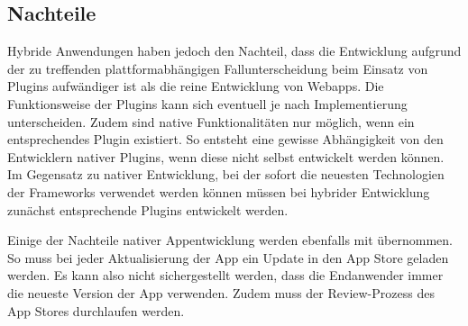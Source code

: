 \subsection{Nachteile}
%
Hybride Anwendungen haben jedoch den Nachteil, dass die Entwicklung aufgrund der zu treffenden plattformabhängigen Fallunterscheidung beim Einsatz von Plugins aufwändiger ist als die reine Entwicklung von Webapps. Die Funktionsweise der Plugins kann sich eventuell je nach Implementierung unterscheiden. Zudem sind native Funktionalitäten nur möglich, wenn ein entsprechendes Plugin existiert. So entsteht eine gewisse Abhängigkeit von den Entwicklern nativer Plugins, wenn diese nicht selbst entwickelt werden können. Im Gegensatz zu nativer Entwicklung, bei der sofort die neuesten Technologien der Frameworks verwendet werden können müssen bei hybrider Entwicklung zunächst entsprechende Plugins entwickelt werden.

Einige der Nachteile nativer Appentwicklung werden ebenfalls mit übernommen. So muss bei jeder Aktualisierung der App ein Update in den App Store geladen werden. Es kann also nicht sichergestellt werden, dass die Endanwender immer die neueste Version der App verwenden. Zudem muss der Review-Prozess des App Stores durchlaufen werden. 